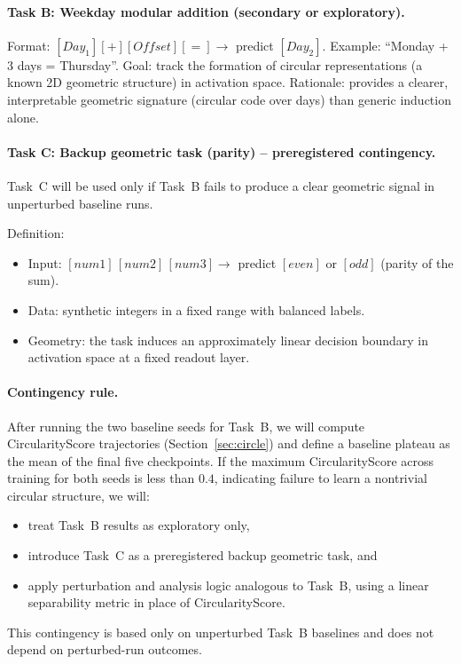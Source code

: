 \documentclass[11pt]{article}
\begin{document}
\paragraph{Task B: Weekday modular addition (secondary or exploratory).}
Format: $[Day_1] [+] [Offset] [=] \rightarrow$ predict $[Day_2]$. Example: ``Monday + 3 days = Thursday''. Goal: track the formation of circular representations (a known 2D geometric structure) in activation space. Rationale: provides a clearer, interpretable geometric signature (circular code over days) than generic induction alone.

\paragraph{Task C: Backup geometric task (parity) -- preregistered contingency.}
Task~C will be used only if Task~B fails to produce a clear geometric signal in unperturbed baseline runs.

Definition:
\begin{itemize}
  \item Input: $[num1]\,[num2]\,[num3] \rightarrow$ predict $[even]$ or $[odd]$ (parity of the sum).
  \item Data: synthetic integers in a fixed range with balanced labels.
  \item Geometry: the task induces an approximately linear decision boundary in activation space at a fixed readout layer.
\end{itemize}

\paragraph{Contingency rule.}
After running the two baseline seeds for Task~B, we will compute CircularityScore trajectories (Section~\ref{sec:circle}) and define a baseline plateau as the mean of the final five checkpoints. If the maximum CircularityScore across training for both seeds is less than $0.4$, indicating failure to learn a nontrivial circular structure, we will:
\begin{itemize}
  \item treat Task~B results as exploratory only,
  \item introduce Task~C as a preregistered backup geometric task, and
  \item apply perturbation and analysis logic analogous to Task~B, using a linear separability metric in place of CircularityScore.
\end{itemize}
This contingency is based only on unperturbed Task~B baselines and does not depend on perturbed-run outcomes.
\end{document}
